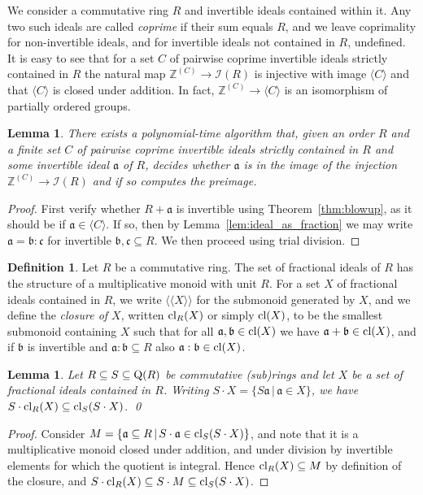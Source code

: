 \documentclass{amsart}
\theoremstyle{plain}
\newtheorem{lemma}[theorem]{Lemma}
\theoremstyle{definition}
\newtheorem{definition}[theorem]{Definition}
\newcommand{\lla}{\langle\!\langle}
\newcommand{\rra}{\rangle\!\rangle}
\newcommand{\Z}{\ensuremath{\mathbb{Z}}}
\begin{document}
We consider a commutative ring $R$ and invertible ideals contained within it.
Any two such ideals are called \emph{coprime} if their sum equals $R$, and we leave coprimality for non-invertible ideals, and for invertible ideals not contained in $R$, undefined.
It is easy to see that for a set \(C\) of pairwise coprime invertible ideals strictly contained in \(R\) the natural map \(\Z^{(C)}\to\mathcal{I}(R)\) is injective with image \(\langle C\rangle\) and that \(\langle C\rangle\) is closed under addition. In fact, \(\Z^{(C)}\to\langle C\rangle\) is an isomorphism of partially ordered groups. %

\begin{lemma}\label{lem:trial_division}
There exists a polynomial-time algorithm that, given an order \(R\) and a finite set \(C\) of pairwise coprime invertible ideals strictly contained in \(R\) and some invertible ideal \(\mathfrak{a}\) of \(R\), decides whether \(\mathfrak{a}\) is in the image of the injection \(\Z^{(C)}\to \mathcal{I}(R)\) and if so computes the preimage.
\end{lemma}
\begin{proof}
First verify whether \(R+\mathfrak{a}\) is invertible using Theorem~\ref{thm:blowup}, as it should be if \(\mathfrak{a}\in \langle C\rangle\). 
If so, then by Lemma~\ref{lem:ideal_as_fraction} we may write \(\mathfrak{a}=\mathfrak{b}:\mathfrak{c}\) for invertible \(\mathfrak{b},\mathfrak{c}\subseteq R\). We then proceed using trial division.
\end{proof}

\begin{definition}
Let \(R\) be a commutative ring. The set of fractional ideals of \(R\) has the structure of a multiplicative monoid with unit \(R\).
For a set \(X\) of fractional ideals contained in \(R\), we write \(\lla X \rra\) for the submonoid generated by \(X\), and we define the {\em closure of \(X\)}, written \(\textup{cl}_R(X)\) or simply \(\textup{cl}(X)\), to be the smallest submonoid containing \(X\) such that for all \(\mathfrak{a},\mathfrak{b}\in \textup{cl}(X)\) we have \(\mathfrak{a}+\mathfrak{b}\in\textup{cl}(X)\), and if \(\mathfrak{b}\) is invertible and \(\mathfrak{a}:\mathfrak{b}\subseteq R\) also \(\mathfrak{a}:\mathfrak{b}\in\textup{cl}(X)\).
\end{definition}

\begin{lemma}
Let \(R\subseteq S \subseteq\textup{Q}(R)\) be commutative (sub)rings and let \(X\) be a set of fractional ideals contained in \(R\).
Writing \(S\cdot X=\{S\mathfrak{a}\,|\, \mathfrak{a}\in X\}\), we have \(S\cdot \textup{cl}_R(X)\subseteq \textup{cl}_S(S\cdot X)\). \qed
\end{lemma}
\begin{proof}
Consider $M=\{\mathfrak{a}\subseteq R\,|\, S\cdot \mathfrak{a} \in \textup{cl}_S(S\cdot X)\}$, and note that it is a multiplicative monoid closed under addition, and under division by invertible elements for which the quotient is integral. Hence $\textup{cl}_R(X)\subseteq M$ by definition of the closure, and $S\cdot \textup{cl}_R(X)\subseteq S\cdot M \subseteq \textup{cl}_S(S\cdot X)$.
\end{proof}
\end{document}
